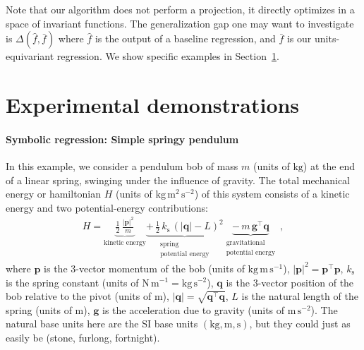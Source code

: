 \documentclass[twoside,11pt]{article}
\newcommand{\sectionname}{Section}
\newcommand{\secref}[1]{\sectionname~\ref{#1}}
\newcommand{\unit}[1]{\mathrm{#1}}
\newcommand{\kg}{\unit{kg}}
\newcommand{\m}{\unit{m}}
\newcommand{\s}{\unit{s}}
\newcommand{\N}{\unit{N}}
\begin{document}
Note that our algorithm does not perform a projection, it directly optimizes in a space of invariant functions. The generalization gap one may want to investigate is $\Delta(\hat f, \bar f)$ where $\hat f$ is the output of a baseline regression, and $\bar f$ is our units-equivariant regression. We show specific examples in \secref{sec:experiments}.



\section{Experimental demonstrations}\label{sec:experiments}

\paragraph{Symbolic regression: Simple springy pendulum}
In this example, we consider a pendulum bob of mass $m$ (units of $\kg$) at the end of a linear spring, swinging under the influence of gravity.
The total mechanical energy or hamiltonian $H$ (units of $\kg\,\m^{2}\,\s^{-2}$) of this system consists of a kinetic energy and two potential-energy contributions:
\begin{align}
    H = \underbrace{\frac{1}{2}\,\frac{|\mathbf{p}|^2}{m}}_{\text{kinetic energy}}
    \underbrace{+\,\frac{1}{2}\,k_\text{s}\,(|\mathbf{q}| - L)^2}_{\substack{\text{spring} \\ \text{potential energy}}}
    \underbrace{-\,m\,\mathbf{g}^\top\mathbf{q}}_{\substack{\text{gravitational} \\ \text{potential energy}}} ~,
\end{align}
where $\mathbf{p}$ is the 3-vector momentum of the bob (units of $\kg\,\m\,\s^{-1}$), $|\mathbf{p}|^2 = \mathbf{p}^\top\mathbf{p}$, $k_\text{s}$ is the spring constant (units of $\N\,\m^{-1}=\kg\,\s^{-2}$), $\mathbf{q}$ is the 3-vector position of the bob relative to the pivot (units of $\m$), $|\mathbf{q}|=\sqrt{\mathbf{q}^\top\mathbf{q}}$, $L$ is the natural length of the spring (units of $\m$), $\mathbf{g}$ is the acceleration due to gravity (units of $\m\,\s^{-2}$).
The natural base units here are the SI base units $(\kg,\m,\s)$, but they could just as easily be (stone, furlong, fortnight).
\end{document}
